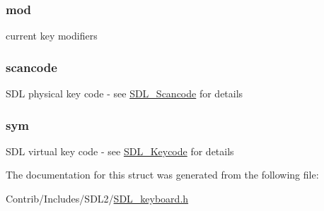 \subsubsection[{\texorpdfstring{mod}{mod}}]{ mod}\hypertarget{struct_s_d_l___keysym_a09294cbc86473d2bcb27513748b81aec}{}\label{struct_s_d_l___keysym_a09294cbc86473d2bcb27513748b81aec}
current key modifiers 
\subsubsection[{\texorpdfstring{scancode}{scancode}}]{ scancode}\hypertarget{struct_s_d_l___keysym_a9c8d3b45ebf0a9f0673325d40755c066}{}\label{struct_s_d_l___keysym_a9c8d3b45ebf0a9f0673325d40755c066}
S\+DL physical key code -\/ see \hyperlink{_s_d_l__scancode_8h_a82ab7cff701034fb40a47b5b3a02777b}{S\+D\+L\+\_\+\+Scancode} for details 
\subsubsection[{\texorpdfstring{sym}{sym}}]{ sym}\hypertarget{struct_s_d_l___keysym_a20cf23ed00a5cd751fa49ad19e93305a}{}\label{struct_s_d_l___keysym_a20cf23ed00a5cd751fa49ad19e93305a}
S\+DL virtual key code -\/ see \hyperlink{_s_d_l__keycode_8h_ae9265f064f13f0f74dfca26a67875171}{S\+D\+L\+\_\+\+Keycode} for details 

The documentation for this struct was generated from the following file\+:\begin{DoxyCompactItemize}
\item 
Contrib/\+Includes/\+S\+D\+L2/\hyperlink{_s_d_l__keyboard_8h}{S\+D\+L\+\_\+keyboard.\+h}\end{DoxyCompactItemize}
